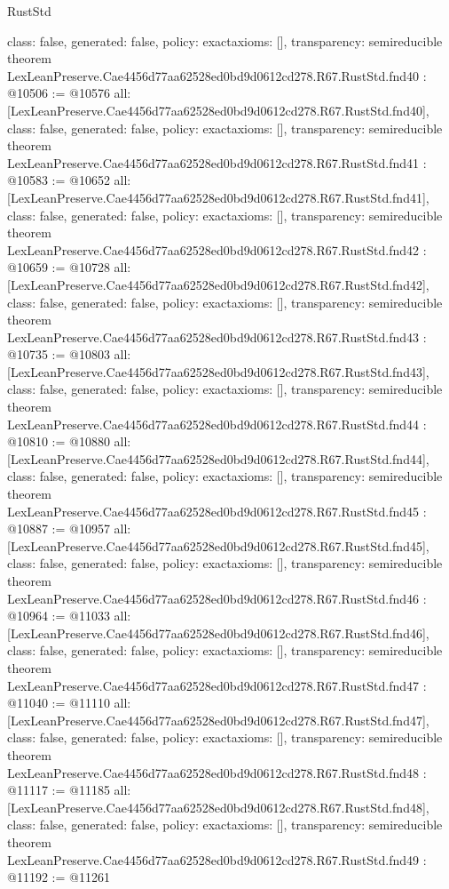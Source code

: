 \begin{lexlean}{RustStd}
\begin{coremodule}
{  class: false,
  generated: false,
  policy: exact{axioms: []},
  transparency: semireducible
}
theorem LexLeanPreserve.Cae4456d77aa62528ed0bd9d0612cd278.R67.RustStd.fnd40 : @10506 := @10576 {
  all: [LexLeanPreserve.Cae4456d77aa62528ed0bd9d0612cd278.R67.RustStd.fnd40],
  class: false,
  generated: false,
  policy: exact{axioms: []},
  transparency: semireducible
}
theorem LexLeanPreserve.Cae4456d77aa62528ed0bd9d0612cd278.R67.RustStd.fnd41 : @10583 := @10652 {
  all: [LexLeanPreserve.Cae4456d77aa62528ed0bd9d0612cd278.R67.RustStd.fnd41],
  class: false,
  generated: false,
  policy: exact{axioms: []},
  transparency: semireducible
}
theorem LexLeanPreserve.Cae4456d77aa62528ed0bd9d0612cd278.R67.RustStd.fnd42 : @10659 := @10728 {
  all: [LexLeanPreserve.Cae4456d77aa62528ed0bd9d0612cd278.R67.RustStd.fnd42],
  class: false,
  generated: false,
  policy: exact{axioms: []},
  transparency: semireducible
}
theorem LexLeanPreserve.Cae4456d77aa62528ed0bd9d0612cd278.R67.RustStd.fnd43 : @10735 := @10803 {
  all: [LexLeanPreserve.Cae4456d77aa62528ed0bd9d0612cd278.R67.RustStd.fnd43],
  class: false,
  generated: false,
  policy: exact{axioms: []},
  transparency: semireducible
}
theorem LexLeanPreserve.Cae4456d77aa62528ed0bd9d0612cd278.R67.RustStd.fnd44 : @10810 := @10880 {
  all: [LexLeanPreserve.Cae4456d77aa62528ed0bd9d0612cd278.R67.RustStd.fnd44],
  class: false,
  generated: false,
  policy: exact{axioms: []},
  transparency: semireducible
}
theorem LexLeanPreserve.Cae4456d77aa62528ed0bd9d0612cd278.R67.RustStd.fnd45 : @10887 := @10957 {
  all: [LexLeanPreserve.Cae4456d77aa62528ed0bd9d0612cd278.R67.RustStd.fnd45],
  class: false,
  generated: false,
  policy: exact{axioms: []},
  transparency: semireducible
}
theorem LexLeanPreserve.Cae4456d77aa62528ed0bd9d0612cd278.R67.RustStd.fnd46 : @10964 := @11033 {
  all: [LexLeanPreserve.Cae4456d77aa62528ed0bd9d0612cd278.R67.RustStd.fnd46],
  class: false,
  generated: false,
  policy: exact{axioms: []},
  transparency: semireducible
}
theorem LexLeanPreserve.Cae4456d77aa62528ed0bd9d0612cd278.R67.RustStd.fnd47 : @11040 := @11110 {
  all: [LexLeanPreserve.Cae4456d77aa62528ed0bd9d0612cd278.R67.RustStd.fnd47],
  class: false,
  generated: false,
  policy: exact{axioms: []},
  transparency: semireducible
}
theorem LexLeanPreserve.Cae4456d77aa62528ed0bd9d0612cd278.R67.RustStd.fnd48 : @11117 := @11185 {
  all: [LexLeanPreserve.Cae4456d77aa62528ed0bd9d0612cd278.R67.RustStd.fnd48],
  class: false,
  generated: false,
  policy: exact{axioms: []},
  transparency: semireducible
}
theorem LexLeanPreserve.Cae4456d77aa62528ed0bd9d0612cd278.R67.RustStd.fnd49 : @11192 := @11261 {
}
\end{coremodule}
\end{lexlean}
